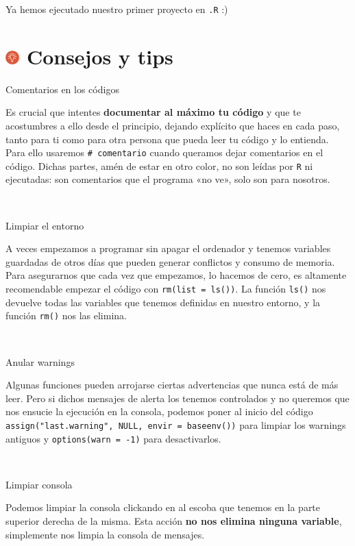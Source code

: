\documentclass[11pt,]{book}
\begin{document}
Ya hemos ejecutado nuestro primer proyecto en \texttt{.R} :)

\hypertarget{consejos-y-tips-3}{%
\section[ Consejos y tips]{\texorpdfstring{\protect\includegraphics[width=0.04\textwidth,height=\textheight]{img/logo_info.png} Consejos y tips}{ Consejos y tips}}\label{consejos-y-tips-3}}

Comentarios en los códigos

Es crucial que intentes \textbf{documentar al máximo tu código} y que te acostumbres a ello desde el principio, dejando explícito que haces en cada paso, tanto para ti como para otra persona que pueda leer tu código y lo entienda. Para ello usaremos \texttt{\#\ comentario} cuando queramos dejar comentarios en el código. Dichas partes, amén de estar en otro color, no son leídas por \texttt{R} ni ejecutadas: son comentarios que el programa «no ve», solo son para nosotros.

~

Limpiar el entorno

A veces empezamos a programar sin apagar el ordenador y tenemos variables guardadas de otros días que pueden generar conflictos y consumo de memoria. Para asegurarnos que cada vez que empezamos, lo hacemos de cero, es altamente recomendable empezar el código con \texttt{rm(list\ =\ ls())}. La función \texttt{ls()} nos devuelve todas las variables que tenemos definidas en nuestro entorno, y la función \texttt{rm()} nos las elimina.

~

Anular warnings

Algunas funciones pueden arrojarse ciertas advertencias que nunca está de más leer. Pero si dichos mensajes de alerta los tenemos controlados y no queremos que nos ensucie la ejecución en la consola, podemos poner al inicio del código \texttt{assign("last.warning",\ NULL,\ envir\ =\ baseenv())} para limpiar los warnings antiguos y \texttt{options(warn\ =\ -1)} para desactivarlos.

~

Limpiar consola

Podemos limpiar la consola clickando en al escoba que tenemos en la parte superior derecha de la misma. Esta acción \textbf{no nos elimina ninguna variable}, simplemente nos limpia la consola de mensajes.
\end{document}
